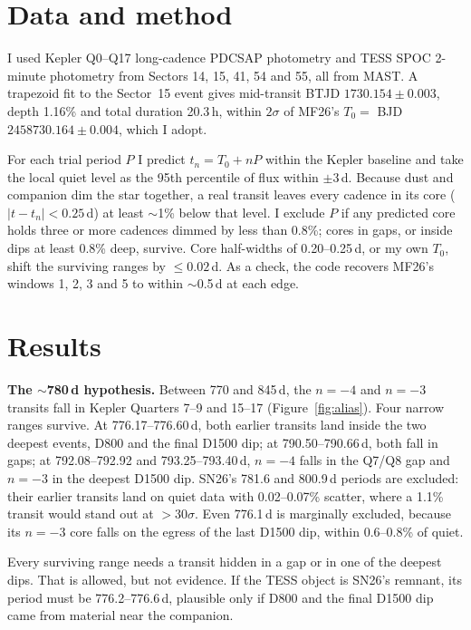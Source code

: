 \documentclass{aastex701}
\begin{document}
\section{Data and method}

I used Kepler Q0--Q17 long-cadence PDCSAP photometry \citep[][SAP\_QUALITY $=0$, each quarter normalized to its
median]{Borucki2010} and TESS SPOC 2-minute photometry \citep{Ricker2015} from Sectors 14, 15, 41, 54 and 55, all
from MAST. A trapezoid fit to the Sector~15 event gives mid-transit BTJD $1730.154\pm0.003$, depth 1.16\% and
total duration 20.3\,h, within $2\sigma$ of MF26's $T_0=$ BJD $2458730.164\pm0.004$, which I adopt.

For each trial period $P$ I predict $t_n=T_0+nP$ within the Kepler baseline and take the local quiet level as
the 95th percentile of flux within $\pm3$\,d. Because dust and companion dim the star together, a real transit
leaves every cadence in its core ($|t-t_n|<0.25$\,d) at least $\sim$1\% below that level. I exclude $P$ if any
predicted core holds three or more cadences dimmed by less than 0.8\%; cores in gaps, or inside dips at least
0.8\% deep, survive. Core half-widths of 0.20--0.25\,d, or my own $T_0$, shift the surviving ranges by
$\leq0.02$\,d. As a check, the code recovers MF26's windows 1, 2, 3 and 5 to within $\sim$0.5\,d at each edge.

\section{Results}

\textbf{The $\sim$780\,d hypothesis.} Between 770 and 845\,d, the $n=-4$ and $n=-3$ transits fall in Kepler
Quarters 7--9 and 15--17 (Figure~\ref{fig:alias}). Four narrow ranges survive. At 776.17--776.60\,d, both earlier
transits land inside the two deepest events, D800 and the final D1500 dip; at 790.50--790.66\,d, both fall in
gaps; at 792.08--792.92 and 793.25--793.40\,d, $n=-4$ falls in the Q7/Q8 gap and $n=-3$ in the deepest D1500
dip. SN26's 781.6 and 800.9\,d periods are excluded: their earlier transits land on quiet data with
0.02--0.07\% scatter, where a 1.1\% transit would stand out at $>30\sigma$. Even 776.1\,d is marginally excluded,
because its $n=-3$ core falls on the egress of the last D1500 dip, within 0.6--0.8\% of quiet.

Every surviving range needs a transit hidden in a gap or in one of the deepest dips. That is allowed, but not
evidence. If the TESS object is SN26's remnant, its period must be 776.2--776.6\,d, plausible only if D800 and
the final D1500 dip came from material near the companion.
\end{document}
